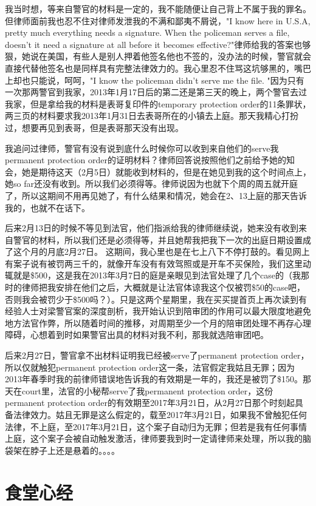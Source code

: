 \documentclass[12pt]{book}
\begin{document}
我当时想，等来自警官的材料是一定的，我不能随便让自己背上不属于我的罪名。但律师面前我也忍不住对律师发泄我的不满和鄙夷不屑说，"I know here in U.S.A, pretty much everything needs a signature. When the policeman serves a file, doesn't it need a signature at all before it becomes effective?"律师给我的答案也够狠，她说在美国，有些人是别人押着他签名他也不签的，没办法的时候，警官就会直接代替他签名也是同样具有完整法律效力的。我心里忍不住骂这坑够黑的，嘴巴上却也只能说，呵呵，"I know the policeman didn't serve me the file. "因为只有一次那两警官到我家，2013年1月17日后的第二还是第三天的晚上，两个警官去过我家，但是拿给我的材料是表哥复印件的temporary protection order的11条罪状，两三页的材料要求我2013年1月31日去表哥所在的小镇去上庭。那天我精心打扮过，想要再见到表哥，但是表哥那天没有出现。

我追问过律师，警官有没有说到底什么时候你可以收到来自他们的serve我permanent protection order的证明材料？律师回答说按照他们之前给予她的知会，她是期待这天（2月5日）就能收到材料的，但是在她见到我的这个时间点上，她so far还没有收到。所以我们必须得等。律师说因为也就下个周的周五就开庭了，所以这期间不用再见她了，有什么结果和情况，她会在2、13上庭的那天告诉我的，也就不在话下。

后来2月13日的时候不等见到法官，他们指派给我的律师继续说，她来没有收到来自警官的材料，所以我们还是必须得等，并且她帮我把我下一次的出庭日期设置成了这个月的月底2月27日。
这期间，我心里也是在七上八下不停打鼓的。看见网上有案子说有被罚两三千的，就像开车没有有效驾照或是开车不买保险，我们这里动辄就是\$500，这是我在2013年3月7日的庭是亲眼见到法官处理了几个case的（我那时的律师把我安排在他们之后，大概就是让法官体谅我这个仅被罚\$50的case吧，否则我会被罚少于\$500吗？）。只是这两个星期里，我在买买提首页上再次读到有经验人士对梁警官案的深度剖析，我开始认识到陪审团的作用可以最大限度地避免地方法官作弊，所以随着时间的推移，对周期至少一个月的陪审团处理不再存心理障碍，心想着到时如果警官出具的材料对我不利，那我就选陪审团吧。

后来2月27日，警官拿不出材料证明我已经被serve了permanent protection order，所以仅就触犯permanent protection order这一条，法官假定我姑且无罪；因为2013年春季时我的前律师错误地告诉我的有效期是一年的，我还是被罚了\$150。那天在court里，法官的小秘帮serve了我permanent protection order，这份permanent protection order的有效期至2017年3月21日，从2月27日那个时刻起具备法律效力。姑且无罪是这么假定的，载至2017年3月21日，如果我不曾触犯任何法律，不上庭，至2017年3月21日，这个案子自动归为无罪；但若是我有任何事情上庭，这个案子会被自动触发激活，律师要我到时一定请律师来处理，所以我的脑袋架在脖子上还是悬着的。。。。
\chapter{食堂心经}
\label{sec-41}
\end{document}
